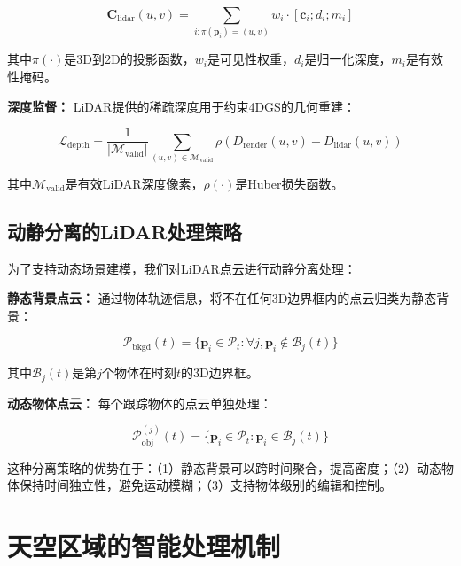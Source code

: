 \begin{equation}
\mathbf{C}_{\text{lidar}}(u,v) = \sum_{i: \pi(\mathbf{p}_i) = (u,v)} w_i \cdot [\mathbf{c}_i; d_i; m_i]
\label{eq:lidar_condition_generation}
\end{equation}

其中$\pi(\cdot)$是3D到2D的投影函数，$w_i$是可见性权重，$d_i$是归一化深度，$m_i$是有效性掩码。

\textbf{深度监督：}
LiDAR提供的稀疏深度用于约束4DGS的几何重建：

\begin{equation}
\mathcal{L}_{\text{depth}} = \frac{1}{|\mathcal{M}_{\text{valid}}|} \sum_{(u,v) \in \mathcal{M}_{\text{valid}}} \rho(D_{\text{render}}(u,v) - D_{\text{lidar}}(u,v))
\label{eq:depth_supervision}
\end{equation}

其中$\mathcal{M}_{\text{valid}}$是有效LiDAR深度像素，$\rho(\cdot)$是Huber损失函数。

\subsection{动静分离的LiDAR处理策略}

为了支持动态场景建模，我们对LiDAR点云进行动静分离处理：

\textbf{静态背景点云：}
通过物体轨迹信息，将不在任何3D边界框内的点云归类为静态背景：

\begin{equation}
\mathcal{P}_{\text{bkgd}}(t) = \{\mathbf{p}_i \in \mathcal{P}_t : \forall j, \mathbf{p}_i \notin \mathcal{B}_j(t)\}
\label{eq:background_points}
\end{equation}

其中$\mathcal{B}_j(t)$是第$j$个物体在时刻$t$的3D边界框。

\textbf{动态物体点云：}
每个跟踪物体的点云单独处理：

\begin{equation}
\mathcal{P}_{\text{obj}}^{(j)}(t) = \{\mathbf{p}_i \in \mathcal{P}_t : \mathbf{p}_i \in \mathcal{B}_j(t)\}
\label{eq:object_points}
\end{equation}

这种分离策略的优势在于：（1）静态背景可以跨时间聚合，提高密度；（2）动态物体保持时间独立性，避免运动模糊；（3）支持物体级别的编辑和控制。

\section{天空区域的智能处理机制}

